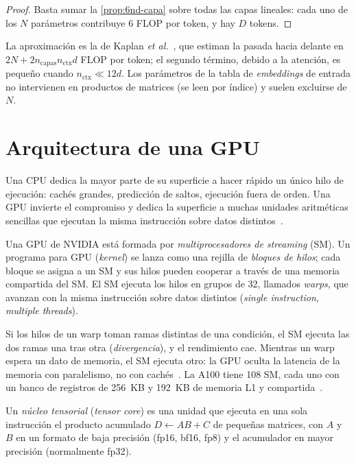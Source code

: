 \begin{proof}
Basta sumar la \cref{prop:6nd-capa} sobre todas las capas lineales: cada uno de los $N$ parámetros contribuye $6$ FLOP por token, y hay $D$ tokens.
\end{proof}

La aproximación es la de Kaplan \emph{et al.}~\cite[§2.1 y tabla~1]{kaplan}, que estiman la pasada hacia delante en $2N+2n_{\mathrm{capas}}n_{\mathrm{ctx}}d$ FLOP por token; el segundo término, debido a la atención, es pequeño cuando $n_{\mathrm{ctx}}\ll 12d$. Los parámetros de la tabla de \emph{embeddings} de entrada no intervienen en productos de matrices (se leen por índice) y suelen excluirse de $N$.

\section{Arquitectura de una GPU}

Una CPU dedica la mayor parte de su superficie a hacer rápido un único hilo de ejecución: cachés grandes, predicción de saltos, ejecución fuera de orden. Una GPU invierte el compromiso y dedica la superficie a muchas unidades aritméticas sencillas que ejecutan la misma instrucción sobre datos distintos~\cite[cap.~4]{hp}.

\begin{definicion}
Una GPU de NVIDIA está formada por \emph{multiprocesadores de streaming} (SM). Un programa para GPU (\emph{kernel}) se lanza como una rejilla de \emph{bloques de hilos}; cada bloque se asigna a un SM y sus hilos pueden cooperar a través de una memoria compartida del SM. El SM ejecuta los hilos en grupos de 32, llamados \emph{warps}, que avanzan con la misma instrucción sobre datos distintos (\emph{single instruction, multiple threads}).
\end{definicion}

Si los hilos de un warp toman ramas distintas de una condición, el SM ejecuta las dos ramas una tras otra (\emph{divergencia}), y el rendimiento cae. Mientras un warp espera un dato de memoria, el SM ejecuta otro: la GPU oculta la latencia de la memoria con paralelismo, no con cachés~\cite{cmu418}. La A100 tiene 108 SM, cada uno con un banco de registros de 256~KB y 192~KB de memoria L1 y compartida~\cite{a100}.

\begin{definicion}
Un \emph{núcleo tensorial} (\emph{tensor core}) es una unidad que ejecuta en una sola instrucción el producto acumulado $D\gets AB+C$ de pequeñas matrices, con $A$ y $B$ en un formato de baja precisión (fp16, bf16, fp8) y el acumulador en mayor precisión (normalmente fp32).
\end{definicion}


